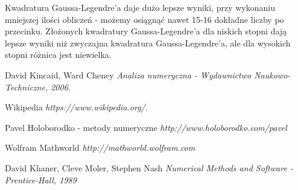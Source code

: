 \documentclass{article}
\begin{document}
Kwadratura Gaussa-Legendre'a daje dużo lepsze wyniki, przy wykonaniu mniejszej ilości obliczeń - możemy osiągnąć nawet 15-16 dokładne liczby po przecinku. Złożonych kwadratury Gaussa-Legendre'a dla niskich stopni dają lepsze wyniki niż zwyczajna kwadratura Gaussa-Legendre'a, ale dla wysokich stopni różnica jest niewielka.
\begin{thebibliography}{9}

  
  David Kincaid, Ward Cheney
  \emph{Analiza numeryczna - Wydawnictwo Naukowo-Techniczne, 2006}.

  Wikipedia
  \emph{https://www.wikipedia.org/}.

	Pavel Holoborodko - metody numeryczne
		\emph{http://www.holoborodko.com/pavel}

	Wolfram Mathworld
		\emph{http://mathworld.wolfram.com}

	David Khaner, Cleve Moler, Stephen Nash
	\emph{Numerical Methods and Software - Prentice-Hall, 1989}
\end{thebibliography}
\end{document}
